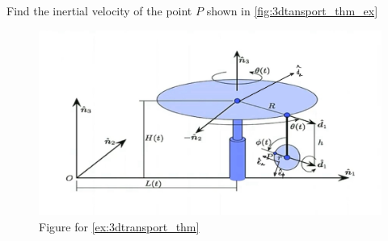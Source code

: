 \begin{example}
	\label{ex:3dtransport_thm}
	Find the inertial velocity of the point \(P\) shown in \autoref{fig:3dtansport_thm_ex}
	\begin{figure}[H]
		\centering
		\includegraphics[width=\linewidth]{figures/dynamics/3D_transport_thm_ex.jpg}
		\caption{Figure for \autoref{ex:3dtransport_thm}}
		\label{fig:3dtansport_thm_ex}
	\end{figure}


\end{example}
